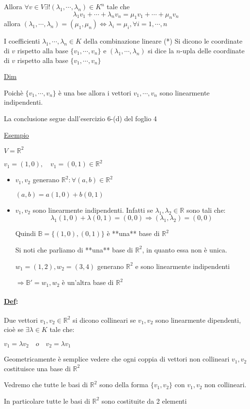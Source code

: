 \documentclass{article}
\newcommand{\ul}[1]{\underline{#1}}
\newcommand{\B}{\mathbb{B}}
\newcommand{\R}{\mathbb{R}}
\newcommand{\Def}[2]{\paragraph{\ul{Def}:}#1\\\hspace*{3em}\begin{minipage}{.8\textwidth}#2\end{minipage}}
\begin{document}
Allora $\forall v\in V\exists!(\lambda_1,\cdots,\lambda_n)\in K^n$ tale che
$$\lambda_1v_1+\cdots+\lambda_nv_n=\mu_1v_1+\cdots+\mu_nv_n$$
allora $(\lambda_1,\cdots,\lambda_n)=(\mu_1,\mu_n)\Leftrightarrow\lambda_i=\mu_i,\forall i=1,\cdots,n$

I coefficienti $\lambda_1,\cdots,\lambda_n\in K$ della combinazione lineare (*) Si dicono le coordinate di $v$ rispetto alla base $\{v_1,\cdots,v_n\}$ e $(\lambda_1,\cdots,\lambda_n)$ si dice la $n$-upla delle coordinate di $v$ rispetto alla base $\{v_1,\cdots,v_n\}$

\ul{Dim}

Poichè $\{v_1,\cdots,v_n\}$ è una bse allora i vettori $v_1,\cdots,v_n$ sono linearmente indipendenti.

La conclusione segue dall'esercizio 6-(d) del foglio 4

\ul{Esempio}

$V=\R^2$

$v_1=(1,0),\quad v_1=(0,1)\in\R^2$
\begin{itemize}
	\item $v_1,v_2$ generano $\R^2:\forall(a,b)\in\R^2$

	  $(a,b)=a(1,0)+b(0,1)$
	\item $v_1,v_2$ sono linearmente indipendenti. Infatti se $\lambda_1,\lambda_2\in\R$ sono tali che:
	  $$\lambda_1(1,0)+\lambda(0,1)=(0,0)\Rightarrow(\lambda_1,\lambda_2)=(0,0)$$

	  Quindi $\B=\{(1,0),(0,1)\}$ è **una** base di $\R^2$

	  Si noti che parliamo di **una** base di $\R^2$, in quanto essa non è unica.

	  $w_1=(1,2),w_2=(3,4)$ generano $\R^2$ e sono linearmente indipendenti

	  $\Rightarrow\B'={w_1,w_2}$ è un'altra base di $\R^2$
\end{itemize}

\Def{Due vettori $v_1,v_2\in\R^2$ si dicono collineari se $v_1,v_2$ sono linearmente dipendenti, cioè se $\exists\lambda\in K$ tale che:}{
	$v_1=\lambda v_2\quad o\quad v_2=\lambda v_1$

	Geometricamente è semplice vedere che ogni coppia di vettori non collineari $v_1,v_2$ costituisce una base di $\R^2$

	Vedremo che tutte le basi di $\R^2$ sono della forma $\{v_1,v_2\}$ con $v_1,v_2$ non collineari.

	In particolare tutte le basi di $\R^2$ sono costituite da 2 elementi
}
\end{document}
